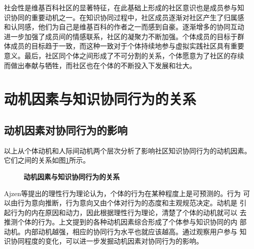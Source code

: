 社会性是维基百科社区的显著特征，在此基础上形成的社区意识也是成员参与知
识协同的重要动机之一。在知识协同过程中，社区成员逐渐对社区产生了归属感
和认同感，他们为自己是维基百科的作者之一而感到自豪。逐渐增多的协同互动
进一步加强了成员间的情感联系，社区的凝聚力不断加强。个体成员的目标于群
体成员的目标趋于一致，而这种一致对于个体持续地参与虚拟实践社区具有重要
意义。最后，社区同个体之间形成了不可分割的关系，个体愿意为了社区的存续
而做出奉献与牺牲，而社区也在个体的不断投入下发展和壮大。


\section{动机因素与知识协同行为的关系}
  
\subsection{动机因素对协同行为的影响}

以上从个体动机和人际间动机两个层次分析了影响社区知识协同行为的动机因素。
它们之间的关系如图\ref{fig:motivation}所示。
\begin{figure}
 
    \centering
    \caption{\small{\textbf{动机因素与知识协同行为的关系}}}
  \label{fig:motivation}
  \end{figure}

Ajzen等提出的理性行为理论认为，个体的行为在某种程度上是可预测的。行为
可以由行为意向推断，行为意向又由个体对行为的态度和主观规范决定。动机是
引起行为的内在原因和动力，因此根据理性行为理论，清楚了个体的动机就可以
去推测个体的行为。上文提到的各种动机因素综合形成了个体参与知识协同的内
部动机。内部动机越强，相应的协同行为水平也就应该越高。通过观察用户参与
知识协同程度的变化，可以进一步发掘动机因素对协同行为的影响。

